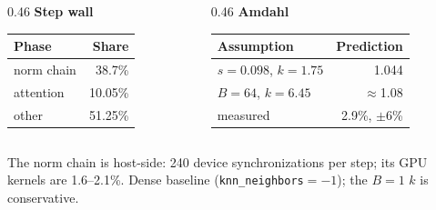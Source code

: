 \begin{frame}
  \centering
  \begin{columns}[c]
    \begin{column}{0.46\textwidth}
      \centering
      {\small\textbf{Step wall}}\par\vspace{1.5mm}
      {\footnotesize
      \renewcommand{\arraystretch}{1.25}
      \begin{tabular}{@{}lr@{}}
        \toprule
        Phase & Share\\
        \midrule
        norm chain & 38.7\%\\
        attention & 10.05\%\\
        other & 51.25\%\\
        \bottomrule
      \end{tabular}}
    \end{column}
    \begin{column}{0.46\textwidth}
      \centering
      {\small\textbf{Amdahl}}\par\vspace{1.5mm}
      {\footnotesize
      \renewcommand{\arraystretch}{1.25}
      \begin{tabular}{@{}lr@{}}
        \toprule
        Assumption & Prediction\\
        \midrule
        $s=0.098$, $k=1.75$ & 1.044\\
        $B{=}64$, $k=6.45$ & $\approx$1.08\\
        measured & 2.9\%, $\pm$6\%\\
        \bottomrule
      \end{tabular}}
    \end{column}
  \end{columns}
  \vspace{3mm}

  {\footnotesize The norm chain is host-side: 240 device synchronizations per step; its GPU kernels are 1.6--2.1\%. Dense baseline (\texttt{knn\_neighbors}$=-1$); the $B{=}1$ $k$ is conservative.\par}
\end{frame}

